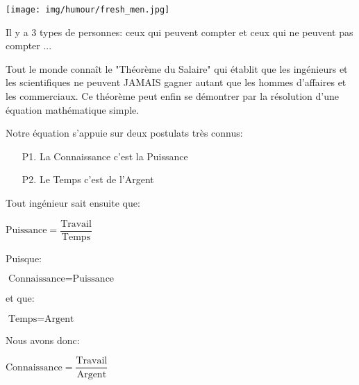 \begin{center}\underline{\hspace{5 cm}}\end{center}
	
	\begin{center}
		\texttt{[image: img/humour/fresh\_men.jpg]}	
	\end{center}
	
	\begin{center}\underline{\hspace{5 cm}}\end{center}	

Il y a 3 types de personnes: ceux qui peuvent compter et ceux qui ne peuvent pas compter ...

	\begin{center}\underline{\hspace{5 cm}}\end{center}	
	
Tout le monde connaît le "Théorème du Salaire" qui établit que les ingénieurs et les scientifiques ne peuvent JAMAIS gagner autant que les hommes d'affaires et les commerciaux. Ce théorème peut enfin se démontrer par la résolution d'une équation mathématique simple.

Notre équation s'appuie sur deux postulats très connus:
\begin{itemize}
	\item[P1.] La Connaissance c'est la Puissance
	\item[P2.] Le Temps c'est de l'Argent
\end{itemize}

Tout ingénieur sait ensuite que:

\begin{center}
$\text{Puissance}=\dfrac{\text{Travail}}{\text{Temps}}$
\end{center}

Puisque:

\begin{center}
$\text{Connaissance}=\text{Puissance}$
\end{center}

et que:

\begin{center}
$\text{Temps}=\text{Argent}$
\end{center}

Nous avons donc: 

\begin{center}
$\text{Connaissance}=\dfrac{\text{Travail}}{\text{Argent}}$
\end{center}

